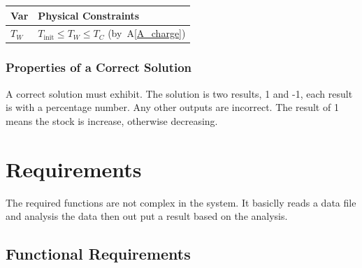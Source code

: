 \documentclass[12pt]{article}
\newcommand{\aref}[1]{A\ref{#1}}
\begin{document}
\begin{table}[!h]
\caption{Output Variables} \label{TblOutputVar}
\renewcommand{\arraystretch}{1.2}
\noindent \begin{longtable*}{l l} 
  \toprule
  \textbf{Var} & \textbf{Physical Constraints} \\
  \midrule 
  $T_W$ & $T_\text{init} \leq T_W \leq T_C$ (by~\aref{A_charge})
  \\
  \bottomrule
\end{longtable*}
\end{table}

\subsubsection{Properties of a Correct Solution} \label{sec_CorrectSolution}

\noindent
A correct solution must exhibit. The solution is two results, 1 and -1, each result is with a percentage number.  Any other outputs are incorrect. The result of 1 means the stock is increase, otherwise decreasing.

\section{Requirements}

The required functions are not complex in the system. It basiclly reads a data file and analysis the data then out put a result based on the analysis. 

\subsection{Functional Requirements}
\end{document}
